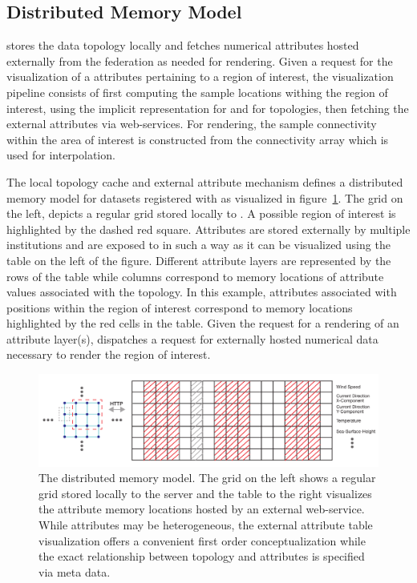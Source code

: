 \subsection{Distributed Memory Model}
\sciwms{} stores the data topology locally and fetches numerical
attributes hosted externally from the federation as needed for
rendering. Given a request for the visualization of a attributes
pertaining to a region of interest, the visualization pipeline
consists of first computing the sample locations withing the region of
interest, using the implicit representation for \cgrid{} and \rtree{}
for \ugrid{} topologies, then fetching the external attributes via
\ogc{} web-services. For rendering, the sample connectivity within the
area of interest is constructed from the connectivity array which is
used for interpolation.

The local topology cache and external attribute mechanism defines a
distributed memory model for datasets registered with \sciwms{} as
visualized in figure~\ref{fig:sciwms_mem_model}. The grid on the left,
depicts a regular grid stored locally to \sciwms{}. A possible region
of interest is highlighted by the dashed red square. Attributes are
stored externally by multiple institutions and are exposed to
\sciwms{} in such a way as it can be visualized using the table on the
left of the figure. Different attribute layers are represented by the
rows of the table while columns correspond to memory locations of
attribute values associated with the topology. In this example,
attributes associated with positions within the region of interest
correspond to memory locations highlighted by the red cells in the
table. Given the request for a rendering of an attribute layer(s),
\sciwms{} dispatches a request for externally hosted numerical data
necessary to render the region of interest.
\begin{figure}[ht!]
  \centering
  \includegraphics[width=\textwidth]{../figs/topology_memModel}
  \caption{The \sciwms{} distributed memory model. The grid on the
    left shows a regular grid stored locally to the \sciwms{} server
    and the table to the right visualizes the attribute memory
    locations hosted by an external web-service. While attributes may
    be heterogeneous, the external attribute table visualization
    offers a convenient first order conceptualization while the exact
    relationship between topology and attributes is specified via
    \ncml{} meta data.}
  \label{fig:sciwms_mem_model}
\end{figure}
